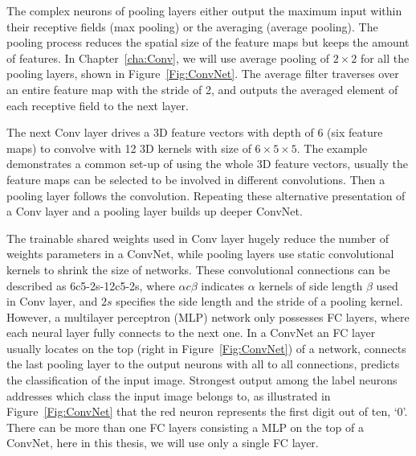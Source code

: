 The complex neurons of pooling layers either output the maximum input within their receptive fields (max pooling) or the averaging (average pooling).
The pooling process reduces the spatial size of the feature maps but keeps the amount of features.
In Chapter~\ref{cha:Conv}, we will use average pooling of $2\times2$ for all the pooling layers, shown in Figure~\ref{Fig:ConvNet}.
The average filter traverses over an entire feature map with the stride of 2, and outputs the averaged element of each receptive field to the next layer.

The next Conv layer drives a 3D feature vectors with depth of 6 (six feature maps) to convolve with 12 3D kernels with size of $6\times5\times5$.
The example demonstrates a common set-up of using the whole 3D feature vectors, usually the feature maps can be selected to be involved in different convolutions.
Then a pooling layer follows the convolution.
Repeating these alternative presentation of a Conv layer and a pooling layer builds up deeper ConvNet.

The trainable shared weights used in Conv layer hugely reduce the number of weights parameters in a ConvNet, while pooling layers use static convolutional kernels to shrink the size of networks.
These convolutional connections can be described as 6c5-2s-12c5-2s, where $\alpha c \beta$ indicates $\alpha$ kernels of side length $\beta$ used in Conv layer, and $2s$ specifies the side length and the stride of a pooling kernel.
However, a multilayer perceptron (MLP) network only possesses FC layers, where each neural layer fully connects to the next one.
In a ConvNet an FC layer usually locates on the top (right in Figure~\ref{Fig:ConvNet}) of a network, connects the last pooling layer to the output neurons with all to all connections, predicts the classification of the input image.
Strongest output among the label neurons addresses which class the input image belongs to, as illustrated in Figure~\ref{Fig:ConvNet} that the red neuron represents the first digit out of ten, `0'.
There can be more than one FC layers consisting a MLP on the top of a ConvNet, here in this thesis, we will use only a single FC layer.



